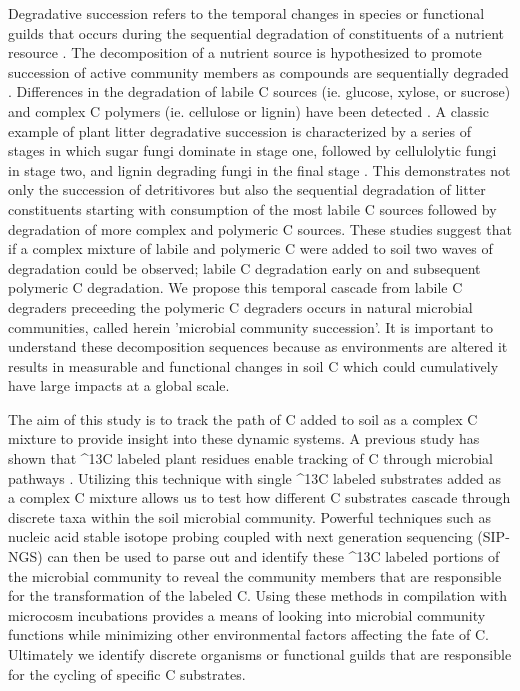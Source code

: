 Degradative succession refers to the temporal changes in species or functional guilds that occurs during the sequential degradation of constituents of a nutrient resource \cite{townsend2003essentials,Bastian_2009}. The decomposition of a nutrient source is hypothesized to promote succession of active community members as compounds are sequentially degraded \cite{Biddanda_1988}. Differences in the degradation of labile C sources (ie. glucose, xylose, or sucrose) and complex C polymers (ie. cellulose or lignin) have been detected \cite{Engelking_2007,Anderson_1973,Stotzky_1961,Alden_2001,Furukawa_1996,Fontaine_2003,Blagodatskaya_2007,Jenkins_2010,Rui_2009,Fierer_2010}. A classic example of plant litter degradative succession is characterized by a series of stages in which sugar fungi dominate in stage one, followed by cellulolytic fungi in stage two, and lignin degrading fungi in the final stage \cite{Gessner_2010}. This demonstrates not only the succession of detritivores but also the sequential degradation of litter constituents starting with consumption of the most labile C sources followed by degradation of more complex and polymeric C sources. These studies suggest that if a complex mixture of labile and polymeric C were added to soil two waves of degradation could be observed; labile C degradation early on and subsequent polymeric C degradation. We propose this temporal cascade from labile C degraders preceeding the polymeric C degraders occurs in natural microbial communities, called herein 'microbial community succession'. It is important to understand these decomposition sequences because as environments are altered it results in measurable and functional changes in soil C \cite{Grandy_2008} which could cumulatively have large impacts at a global scale.   

The aim of this study is to track the path of C added to soil as a complex C mixture to provide insight into these dynamic systems. A previous study has shown that ^{13}C labeled plant residues enable tracking of C through microbial pathways \cite{Evershed_2006}. Utilizing this technique with single ^{13}C labeled substrates added as a complex C mixture allows us to test how different C substrates cascade through discrete taxa within the soil microbial community. Powerful techniques such as nucleic acid stable isotope probing coupled with next generation sequencing (SIP-NGS) can then be used to parse out and identify these ^{13}C labeled portions of the microbial community to reveal the community members that are responsible for the transformation of the labeled C. Using these methods in compilation with microcosm incubations provides a means of looking into microbial community functions while minimizing other environmental factors affecting the fate of C. Ultimately we identify discrete organisms or functional guilds that are responsible for the cycling of specific C substrates.  